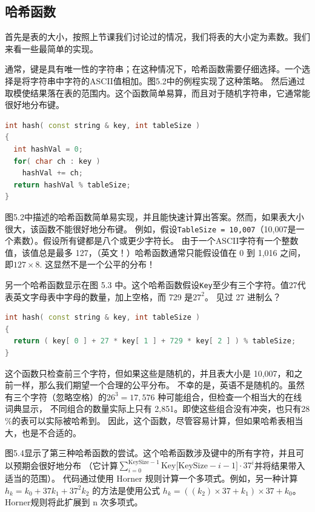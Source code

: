 \documentclass[a4paper]{ctexart}
\theoremstyle{definition}
\theoremstyle{definition}
\begin{document}
\subsection{哈希函数}


首先是表的大小，按照上节课我们讨论过的情况，我们将表的大小定为素数。我们来看一些最简单的实现。

通常，键是具有唯一性的字符串；在这种情况下，哈希函数需要仔细选择。一个选择是将字符串中字符的ASCII值相加。图5.2中的例程实现了这种策略。
然后通过取模使结果落在表的范围内。这个函数简单易算，而且对于随机字符串，它通常能很好地分布键。

\begin{lstlisting}[language=C++]
int hash( const string & key, int tableSize )
{
  int hashVal = 0;
  for( char ch : key )
    hashVal += ch;
  return hashVal % tableSize;
}
\end{lstlisting}  

图5.2中描述的哈希函数简单易实现，并且能快速计算出答案。然而，如果表大小很大，该函数不能很好地分布键。
例如，假设\texttt{TableSize = 10,007}（10,007是一个素数）。假设所有键都是八个或更少字符长。
由于一个ASCII字符有一个整数值，该值总是最多 127，（英文！）哈希函数通常只能假设值在 0 到 1,016 之间，即\(127 \times 8\). 
这显然不是一个公平的分布！

另一个哈希函数显示在图 5.3 中。这个哈希函数假设\texttt{Key}至少有三个字符。值27代表英文字母表中字母的数量，加上空格，而 729 是\(27^2\)。
见过 27 进制么？
\begin{lstlisting}[language=C++]
int hash( const string & key, int tableSize )
{
  return ( key[ 0 ] + 27 * key[ 1 ] + 729 * key[ 2 ] ) % tableSize;
}  
\end{lstlisting}
这个函数只检查前三个字符，但如果这些是随机的，并且表大小是 10,007，和之前一样，那么我们期望一个合理的公平分布。
不幸的是，英语不是随机的。虽然有三个字符（忽略空格）的\(26^3 = 17,576\) 种可能组合，但检查一个相当大的在线词典显示，
不同组合的数量实际上只有 2,851。即使这些组合没有冲突，也只有28 \%的表可以实际被哈希到。
因此，这个函数，尽管容易计算，但如果哈希表相当大，也是不合适的。

图5.4显示了第三种哈希函数的尝试。这个哈希函数涉及键中的所有字符，并且可以预期会很好地分布
（它计算\(\sum_{i=0}^{\text{KeySize}-1} \text{Key[KeySize} - i - 1] \cdot 37^i\)并将结果带入适当的范围）。
代码通过使用 Horner 规则计算一个多项式。例如，另一种计算\(h_k = k_0 + 37k_1 + 37^2k_2\) 的方法是使用公式 \(h_k = ((k_2) \times 37 + k_1) \times 37 + k_0\)。
Horner规则将此扩展到 n 次多项式。
\end{document}
